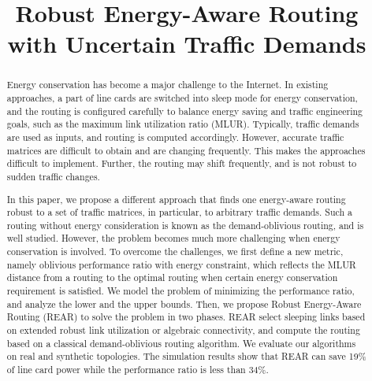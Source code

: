 \documentclass[conference]{IEEEtran}
\begin{document}
\title{Robust Energy-Aware Routing with Uncertain Traffic Demands}


\author{
\and
{}
\and
{}
}


\maketitle

\begin{abstract}
Energy conservation has become a major challenge to the Internet. In existing approaches, a part of line cards 
are switched into sleep mode for energy conservation, and the routing is configured carefully to balance energy saving 
and traffic engineering goals, such as the maximum link utilization ratio (MLUR). Typically, traffic demands are 
used as inputs, and routing is computed accordingly. However, accurate traffic matrices are difficult to obtain and 
are changing frequently. This makes the approaches difficult to implement. Further, the routing may shift 
frequently, and is not robust to sudden traffic changes.

In this paper, we propose a different approach that finds one energy-aware routing robust to a set of traffic 
matrices, in particular, to arbitrary traffic demands. Such a routing without energy consideration is known as 
the demand-oblivious routing, and is well studied. However, the problem becomes much more challenging when energy 
conservation is involved. To overcome the challenges, we first define a new metric, namely oblivious performance 
ratio with energy constraint, which reflects the MLUR distance from a routing to the optimal routing when 
certain energy conservation requirement is satisfied. We model the problem of minimizing the performance ratio, 
and analyze the lower and the upper bounds. Then, we propose Robust Energy-Aware Routing (REAR) to solve 
the problem in two phases. REAR select sleeping links based on extended robust link utilization or algebraic 
connectivity, and compute the routing based on a classical demand-oblivious routing algorithm. 
We evaluate our algorithms on real and synthetic topologies. The simulation results show that REAR can save 
19\% of line card power while the performance ratio is less than 34\%.
\end{abstract}
\end{document}
